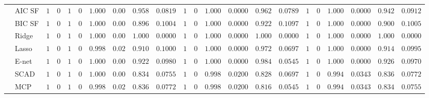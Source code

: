 \begin{tabular}{p{0.2cm}p{1cm}|p{0.6cm}p{0.6cm}|p{0.6cm}p{0.6cm}p{0.6cm}p{0.6cm}p{0.6cm}p{0.6cm}|p{0.6cm}p{0.6cm}p{0.6cm}p{0.6cm}p{0.6cm}p{0.6cm}|p{0.6cm}p{0.6cm}p{0.6cm}p{0.6cm}p{0.6cm}p{0.6cm}}
 & AIC SF  & $1$ & $0$ & $1$ & $0$ & $1.000$ & $0.00$ & $0.958$ & $0.0819$ & $1$ & $0$ & $1.000$ & $0.0000$ & $0.962$ & $0.0789$ & $1$ & $0$ & $1.000$ & $0.0000$ & $0.942$ & $0.0912$ \\
 & BIC SF  & $1$ & $0$ & $1$ & $0$ & $1.000$ & $0.00$ & $0.896$ & $0.1004$ & $1$ & $0$ & $1.000$ & $0.0000$ & $0.922$ & $0.1097$ & $1$ & $0$ & $1.000$ & $0.0000$ & $0.900$ & $0.1005$ \\
 & Ridge  & $1$ & $0$ & $1$ & $0$ & $1.000$ & $0.00$ & $1.000$ & $0.0000$ & $1$ & $0$ & $1.000$ & $0.0000$ & $1.000$ & $0.0000$ & $1$ & $0$ & $1.000$ & $0.0000$ & $1.000$ & $0.0000$ \\
 & Lasso  & $1$ & $0$ & $1$ & $0$ & $0.998$ & $0.02$ & $0.910$ & $0.1000$ & $1$ & $0$ & $1.000$ & $0.0000$ & $0.972$ & $0.0697$ & $1$ & $0$ & $1.000$ & $0.0000$ & $0.914$ & $0.0995$ \\
 & E-net  & $1$ & $0$ & $1$ & $0$ & $1.000$ & $0.00$ & $0.922$ & $0.0980$ & $1$ & $0$ & $1.000$ & $0.0000$ & $0.984$ & $0.0545$ & $1$ & $0$ & $1.000$ & $0.0000$ & $0.926$ & $0.0970$ \\
 & SCAD  & $1$ & $0$ & $1$ & $0$ & $1.000$ & $0.00$ & $0.834$ & $0.0755$ & $1$ & $0$ & $0.998$ & $0.0200$ & $0.828$ & $0.0697$ & $1$ & $0$ & $0.994$ & $0.0343$ & $0.836$ & $0.0772$ \\
 & MCP  & $1$ & $0$ & $1$ & $0$ & $0.998$ & $0.02$ & $0.836$ & $0.0772$ & $1$ & $0$ & $0.998$ & $0.0200$ & $0.816$ & $0.0545$ & $1$ & $0$ & $0.994$ & $0.0343$ & $0.834$ & $0.0755$ \\
\hline 
\end{tabular}

